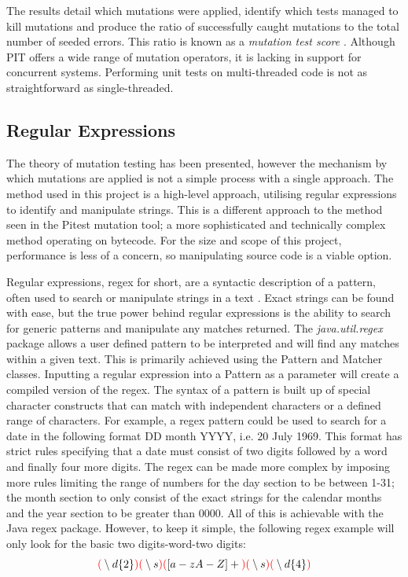 \documentclass[a4paper,12pt]{article}
\begin{document}
The results detail which mutations were applied, identify which tests managed to kill mutations and produce the ratio of successfully caught mutations to the total number of seeded errors. This ratio is known as a \textit{mutation test score} \citep{bradbury06}. Although PIT offers a wide range of mutation operators, it is lacking in support for concurrent systems. Performing unit tests on multi-threaded code is not as straightforward as single-threaded.


\subsection{Regular Expressions}    

The theory of mutation testing has been presented, however the mechanism by which mutations are applied is not a simple process with a single approach. The method used in this project is a high-level approach, utilising regular expressions to identify and manipulate strings. This is a different approach to the method seen in the Pitest mutation tool; a more sophisticated and technically complex method operating on bytecode. For the size and scope of this project, performance is less of a concern, so manipulating source code is a viable option. 

Regular expressions, regex for short, are a syntactic description of a pattern, often used to search or manipulate strings in a text \citep{regex17}. Exact strings can be found with ease, but the true power behind regular expressions is the ability to search for generic patterns and manipulate any matches returned. The \textit{java.util.regex} package allows a user defined pattern to be interpreted and will find any matches within a given text. This is primarily achieved using the Pattern and Matcher classes. Inputting a regular expression into a Pattern as a parameter will create a compiled version of the regex. The syntax of a pattern is built up of special character constructs that can match with independent characters or a defined range of characters. For example, a regex pattern could be used to search for a date in the following format DD month YYYY, i.e. 20 July 1969. This format has strict rules specifying that a date must consist of two digits followed by a word and finally four more digits. The regex can be made more complex by imposing more rules limiting the range of numbers for the day section to be between 1-31; the month section to only consist of the exact strings for the calendar months and the year section to be greater than 0000. All of this is achievable with the Java regex package. However, to keep it simple, the following regex example will only look for the basic two digits-word-two digits:
\begin{equation}
    \textbf{$\color{red}($} \setminus d\{2\} \textbf{$\color{red})($} \setminus s \textbf{$\color{red})($} [a-zA-Z]+ \textbf{$\color{red})($} \setminus s \textbf{$\color{red})($} \setminus d\{4\} \textbf{$\color{red})$}
\end{equation}
\end{document}
